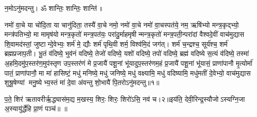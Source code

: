 \setcounter{anuvakam}{0}
न॒मोऽनु॑मदन्तु। ॐ शान्तिः॒ शान्तिः॒ शान्ति॑॥ 

नमो॑ वा॒चे या चो॑दि॒ता या चानु॑दिता॒ तस्यै॑ वा॒चे नमो॒ नमो॑ वा॒चे नमो॑ वा॒चस्पत॑ये॒ नम॒ ऋषि॑भ्यो मन्त्र॒कृद्भ्यो॒ मन्त्र॑पतिभ्यो॒ मा मामृष॑यो मन्त्र॒कृतो॑ मन्त्र॒पत॑यः॒ परा॑दु॒र्माहमृषीन्मन्त्र॒कृतो॑ मन्त्र॒पती॒न्परा॑दां वैश्वदे॒वीं वाच॑मुद्यास शि॒वामद॑स्तां॒ जुष्टान्दे॒वेभ्यः॒ शर्म॑ मे॒ द्यौः  शर्म॑ पृथि॒वी शर्म॒ विश्व॑मि॒दं जग॑त्। शर्म॑ च॒न्द्रश्च॒ सूर्य॑श्च॒ शर्म॑ ब्रह्मप्रजाप॒ती। भू॒तं व॑दिष्ये॒ भुव॑नं वदिष्ये॒ तेजो॑ वदिष्ये॒ यशो॑ वदिष्ये॒ तपो॑ वदिष्ये॒ ब्रह्म॑ वदिष्ये स॒त्यं व॑दिष्ये॒ तस्मा॑ अ॒हमि॒दमु॑प॒स्तर॑ण॒मुप॑स्तृण उप॒स्तर॑णं मे प्र॒जायै॑ पशू॒नां भू॑यादुप॒स्तर॑णम॒हं प्र॒जायै॑ पशू॒नां भू॑यासं॒ प्राणा॑पानौ मृ॒त्योर्मा॑ पातं॒ प्राणा॑पानौ॒ मा मा॑ हासिष्टं॒ मधु॑ मनिष्ये॒ मधु॑ जनिष्ये॒ मधु॑ वक्ष्यामि॒ मधु॑ वदिष्यामि॒ मधु॑मतीं दे॒वेभ्यो॒ वाच॑मुद्यास शुश्रू॒षेण्यां मनु॒ष्येभ्य॒स्तं मा॑ दे॒वा अ॑वन्तु शो॒भायै॑ पि॒तरोऽनु॑मदन्तु॥१॥


प॒ते॒ शिर॑ ऋतावरीर्\mbox{}ऋ॒द्ध्यास॑म॒द्य म॒खस्य॒ शिरः॒ शिरः॒ शिरो॑ऽसि॒ नव॑ च।२॥इय॑ति॒ देवी॒रिन्द्र॒स्यौजोऽस्यग्नि॒जा अ॒स्यायु॑र्द्धेहि प्रा॒णं पञ्च॑॥ ॥
\anuvakamend

